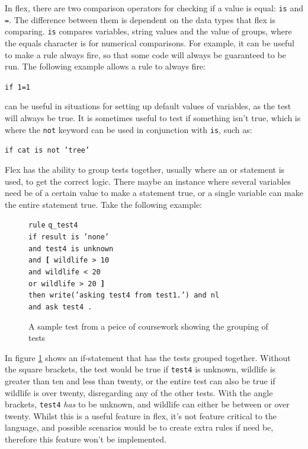 \documentclass[12pt]{report}
\begin{document}
In flex, there are two comparison operators for checking if a value is equal: \texttt{is} and \texttt{=}.  The difference between them is dependent on the data types that flex is comparing.  \texttt{is} compares variables, string values and the value of groups, where the equals character is for numerical comparisons.  For example, it can be useful to make a rule always fire, so that some code will always be guaranteed to be run.  The following example allows a rule to always fire:\\
\begin{center}
\texttt{if 1=1}
\end{center}
can be useful in situations for setting up default values of variables, as the test will always be true.  It is sometimes useful to test if something isn't true, which is where the \texttt{not} keyword can be used in conjunction with \texttt{is}, such as:\\
\begin{center}
\texttt{if cat is not 'tree'}\\
\end{center}
Flex has the ability to group tests together, usually where an or statement is used, to get the correct logic.  There maybe an instance where several variables need be of a certain value to make a statement true, or a single variable can make the entire statement true.  Take the following example:
\begin{figure}[H]
	\begin{tabbing}
		\texttt{rule} \= \texttt{q\_test4}\\
		\> \texttt{if result is 'none'}\\
		\> \texttt{and test4 is unknown}\\
		\> \texttt{and \textbf{[} wildlife > 10}\\
		\> \texttt{and wildlife < 20}\\
		\> \texttt{or wildlife > 20 \textbf{]}}\\
		\> \texttt{then write('asking test4 from test1.') and nl}\\
		\> \texttt{and ask test4 .}\\
	\end{tabbing}
	\caption{A sample test from a peice of coursework showing the grouping of tests}\label{fig:if_grouping}
\end{figure}
In figure \ref{fig:if_grouping} shows an if-statement that has the tests grouped together.  Without the square brackets, the test would be true if \texttt{test4} is unknown, wildlife is greater than ten and less than twenty, or the entire test can also be true if wildlife is over twenty, disregarding any of the other tests.  With the angle brackets, \texttt{test4} \textit{has} to be unknown, and wildlife can either be between or over twenty.  Whilst this is a useful feature in flex, it's not feature critical to the language, and possible scenarios would be to create extra rules if need be, therefore this feature won't be implemented.
\end{document}
